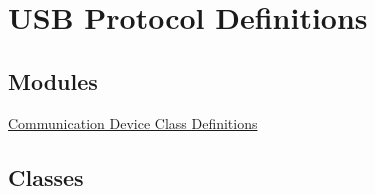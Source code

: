 \hypertarget{group__usb__protocol__group}{\section{U\-S\-B Protocol Definitions}
\label{group__usb__protocol__group}
}
\subsection*{Modules}
\begin{DoxyCompactItemize}
\item 
\hyperlink{group__cdc__protocol__group}{Communication Device Class Definitions}
\end{DoxyCompactItemize}
\subsection*{Classes}
